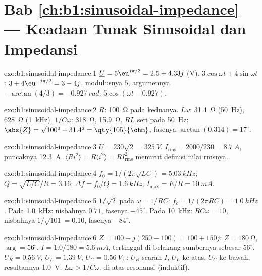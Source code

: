 \section*{Bab \ref{ch:b1:sinusoidal-impedance} --- Keadaan Tunak Sinusoidal dan Impedansi}

\begin{solution}{exo:b1:sinusoidal-impedance:1}
$\underline U = 5\eu^{j\pi/3} = 2.5 + 4.33j$ (V). $3\cos\omega t +
4\sin\omega t$: $3 + 4\eu^{-j\pi/2} = 3 - 4j$, modulusnya $5$, argumennya
$-\arctan(4/3) = \qty{-0.927}{rad}$: $5\cos(\omega t - 0.927)$.
\end{solution}

\begin{solution}{exo:b1:sinusoidal-impedance:2}
$R$: \qty{100}{\ohm} pada keduanya. $L\omega$: \qty{31.4}{\ohm} (\qty{50}{Hz}),
\qty{628}{\ohm} (\qty{1}{kHz}). $1/C\omega$: \qty{318}{\ohm}, \qty{15.9}{\ohm}.
$RL$ seri pada \qty{50}{Hz}: $\abs{\underline Z} = \sqrt{100^2 + 31.4^2} =
\qty{105}{\ohm}$, fasenya $\arctan(0.314) = 17^\circ$.
\end{solution}

\begin{solution}{exo:b1:sinusoidal-impedance:3}
$U = 230\sqrt2 = \qty{325}{V}$. $I_{\mathrm{rms}} = 2000/230 = \qty{8.7}{A}$,
puncaknya \qty{12.3}{A}. $\langle Ri^2\rangle = R\langle i^2\rangle =
RI_{\mathrm{rms}}^2$ menurut definisi nilai rmsnya.
\end{solution}

\begin{solution}{exo:b1:sinusoidal-impedance:4}
$f_0 = 1/(2\pi\sqrt{LC}) = \qty{5.03}{kHz}$; $Q = \sqrt{L/C}/R = 3.16$;
$\Delta f = f_0/Q = \qty{1.6}{kHz}$; $I_{\max} = E/R = \qty{10}{mA}$.
\end{solution}

\begin{solution}{exo:b1:sinusoidal-impedance:5}
$1/\sqrt2$ pada $\omega = 1/RC$: $f_c = 1/(2\pi RC) = \qty{1.0}{kHz}$. Pada
\qty{1.0}{kHz}: nisbahnya $0.71$, fasenya $-45^\circ$. Pada \qty{10}{kHz}:
$RC\omega = 10$, nisbahnya $1/\sqrt{101} = 0.10$, fasenya $-84^\circ$.
\end{solution}

\begin{solution}{exo:b1:sinusoidal-impedance:6}
$\underline Z = 100 + j(250 - 100) = 100 + 150j$: $Z = \qty{180}{\ohm}$,
$\arg = 56^\circ$. $I = 1.0/180 = \qty{5.6}{mA}$, tertinggal di belakang
sumbernya sebesar $56^\circ$. $U_R = \qty{0.56}{V}$, $U_L = \qty{1.39}{V}$, $U_C = \qty{0.56}{V}$;
: $U_R$ searah $I$, $U_L$ ke atas, $U_C$ ke bawah, resultannya \qty{1.0}{V}.
$L\omega > 1/C\omega$: di atas resonansi (induktif).
\end{solution}

